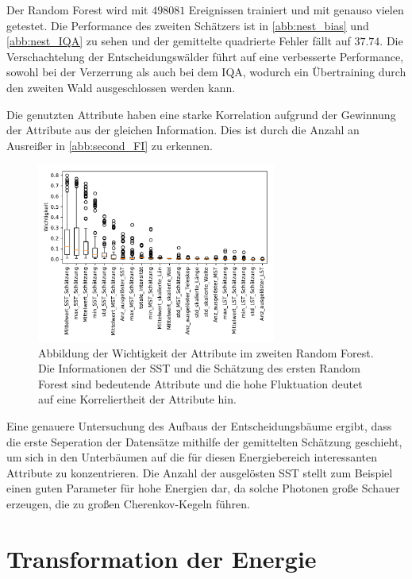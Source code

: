 Der Random Forest wird mit $\num{498081}$ Ereignissen trainiert und mit genauso vielen getestet.
Die Performance des zweiten Schätzers ist in \autoref{abb:nest_bias} und \autoref{abb:nest_IQA} zu sehen und der gemittelte quadrierte Fehler fällt
auf $\num{37.74}$.
Die Verschachtelung der Entscheidungswälder führt auf eine verbesserte Performance, sowohl bei der Verzerrung als auch bei dem IQA, wodurch ein Übertraining
durch den zweiten Wald ausgeschlossen werden kann.

Die genutzten Attribute haben eine starke Korrelation aufgrund der Gewinnung der Attribute aus der gleichen Information.
Dies ist durch die Anzahl an Ausreißer in \autoref{abb:second_FI} zu erkennen.
\begin{figure}
  \includegraphics[width=0.7\textwidth]{Plots/feautureimportance_boxplot_secondForest.pdf}
  \centering
  \caption{Abbildung der Wichtigkeit der Attribute im zweiten Random Forest. Die Informationen der SST und die
          Schätzung des ersten Random Forest sind bedeutende Attribute und die hohe Fluktuation deutet auf eine
          Korreliertheit der Attribute hin.}
  \label{abb:second_FI}
\end{figure}
Eine genauere Untersuchung des Aufbaus der Entscheidungsbäume ergibt, dass die erste Seperation der Datensätze mithilfe der gemittelten Schätzung geschieht,
um sich in den Unterbäumen auf die für diesen Energiebereich interessanten Attribute zu konzentrieren.
Die Anzahl der ausgelösten SST stellt zum Beispiel einen guten Parameter für hohe Energien dar, da solche Photonen große Schauer erzeugen, die
zu großen Cherenkov-Kegeln führen.


\section{Transformation der Energie}
